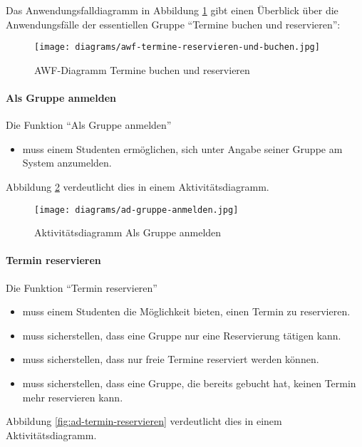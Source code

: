 Das Anwendungsfalldiagramm in Abbildung \ref{fig:awf-termine-reservieren-und-buchen} gibt einen Überblick über die Anwendungsfälle der essentiellen Gruppe ``Termine buchen und
reservieren'':

\begin{figure}
  \centering
  \texttt{[image: diagrams/awf-termine-reservieren-und-buchen.jpg]}
  \caption{AWF-Diagramm Termine buchen und reservieren}
  \label{fig:awf-termine-reservieren-und-buchen}
\end{figure}

\paragraph{Als Gruppe anmelden}

Die Funktion ``Als Gruppe anmelden''
\begin{itemize}
  \item muss einem Studenten ermöglichen, sich unter Angabe seiner Gruppe am System anzumelden.
\end{itemize}

Abbildung \ref{fig:ad-gruppe-anmelden} verdeutlicht dies in einem Aktivitätsdiagramm.

\begin{figure}
  \centering
  \texttt{[image: diagrams/ad-gruppe-anmelden.jpg]}
  \caption{Aktivitätsdiagramm Als Gruppe anmelden}
  \label{fig:ad-gruppe-anmelden}
\end{figure}

\paragraph{Termin reservieren}

Die Funktion ``Termin reservieren''
\begin{itemize}
  \item muss einem Studenten die Möglichkeit bieten, einen Termin zu reservieren.
  \item muss sicherstellen, dass eine Gruppe nur eine Reservierung tätigen kann.
  \item muss sicherstellen, dass nur freie Termine reserviert werden können.
  \item muss sicherstellen, dass eine Gruppe, die bereits gebucht hat, keinen Termin mehr reservieren kann.
\end{itemize}

Abbildung \ref{fig:ad-termin-reservieren} verdeutlicht dies in einem Aktivitätsdiagramm.

